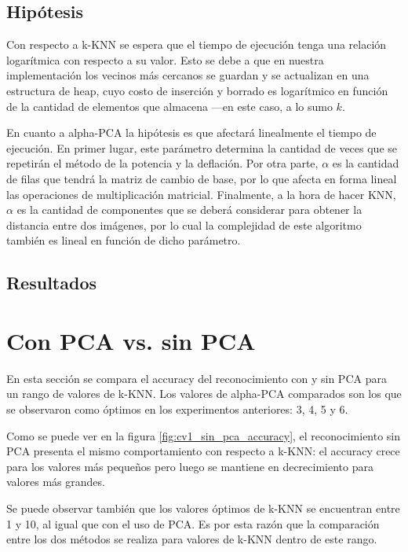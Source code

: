 \subsection{Hipótesis}

Con respecto a k-KNN se espera que el tiempo de ejecución tenga una relación logarítmica con respecto a su valor. Esto se debe a que en nuestra implementación los vecinos más cercanos se guardan y se actualizan en una estructura de heap, cuyo costo de inserción y borrado es logarítmico en función de la cantidad de elementos que almacena ---en este caso, a lo sumo $k$.

En cuanto a alpha-PCA la hipótesis es que afectará linealmente el tiempo de ejecución. En primer lugar, este parámetro determina la cantidad de veces que se repetirán el método de la potencia y la deflación. Por otra parte, $\alpha$ es la cantidad de filas que tendrá la matriz de cambio de base, por lo que afecta en forma lineal las operaciones de multiplicación matricial. Finalmente, a la hora de hacer KNN, $\alpha$ es la cantidad de componentes que se deberá considerar para obtener la distancia entre dos imágenes, por lo cual la complejidad de este algoritmo también es lineal en función de dicho parámetro.

\subsection{Resultados}


\section{Con PCA vs. sin PCA}

En esta sección se compara el accuracy del reconocimiento con y sin PCA para un rango de valores de k-KNN. Los valores de alpha-PCA comparados son los que se observaron como óptimos en los experimentos anteriores: 3, 4, 5 y 6.

Como se puede ver en la figura \ref{fig:cv1_sin_pca_accuracy}, el reconocimiento sin PCA presenta el mismo comportamiento con respecto a k-KNN: el accuracy crece para los valores más pequeños pero luego se mantiene en decrecimiento para valores más grandes.

Se puede observar también que los valores óptimos de k-KNN se encuentran entre 1 y 10, al igual que con el uso de PCA. Es por esta razón que la comparación entre los dos métodos se realiza para valores de k-KNN dentro de este rango.

